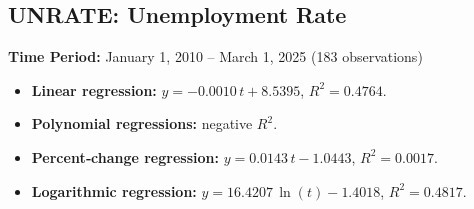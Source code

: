 \documentclass[11pt,a4paper]{article}
\begin{document}
\clearpage
\subsection{UNRATE: Unemployment Rate}
\textbf{Time Period:} January 1, 2010 – March 1, 2025 (183 observations)

\begin{itemize}
  \item \textbf{Linear regression:} \(y = -0.0010\,t + 8.5395\), \(R^2 = 0.4764\).
  \item \textbf{Polynomial regressions:} negative \(R^2\).
  \item \textbf{Percent‐change regression:} \(y = 0.0143\,t - 1.0443\), \(R^2 = 0.0017\).
  \item \textbf{Logarithmic regression:} \(y = 16.4207\,\ln(t) - 1.4018\), \(R^2 = 0.4817\).
\end{itemize}
\end{document}
